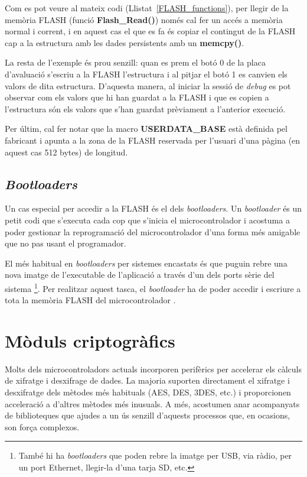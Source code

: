 Com es pot veure al mateix codi (Llistat~\ref{FLASH_functions}), per llegir de la memòria \gls{FLASH} (funció {\bf Flash\_Read()}) només cal fer un accés a memòria normal i corrent, i en aquest cas el que es fa és copiar el contingut de la FLASH cap a la estructura amb les dades persistents amb un {\bf memcpy()}.

La resta de l'exemple és prou senzill: quan es prem el botó 0 de la placa d'avaluació s'escriu a la FLASH l'estructura i al pitjar el botó 1 es canvien els valors de dita estructura. D'aquesta manera, al iniciar la sessió de {\em debug} es pot observar com els valors que hi han guardat a la FLASH i que es copien a l'estructura són els valors que s'han guardat prèviament a l'anterior execució.

Per últim, cal fer notar que la macro {\bf USERDATA\_BASE} està definida pel fabricant i apunta a la zona de la FLASH reservada per l'usuari d'una pàgina (en aquest cas 512 bytes) de longitud.

\section{\em Bootloaders}
\label{sec:Bootloader}
Un cas especial per accedir a la \gls{FLASH} és el dels {\em bootloaders}. Un {\em bootloader} és un petit codi que s'executa cada cop que s'inicia el microcontrolador i acostuma a poder gestionar la reprogramació del microcontrolador d'una forma més amigable que no pas usant el programador.

El més habitual en {\em bootloaders} per sistemes encastats és que puguin rebre una nova imatge de l'executable de l'aplicació a través d'un dels ports sèrie del sistema \footnote{També hi ha {\em bootloaders} que poden rebre la imatge per USB, via ràdio, per un port Ethernet, llegir-la d'una tarja SD, etc.}. Per realitzar aquest tasca, el {\em bootloader} ha de poder accedir i escriure a tota la memòria FLASH del microcontrolador \cite{AN0003}.


\chapter{Mòduls criptogràfics}
Molts dels microcontroladors actuals incorporen perifèrics per accelerar els càlculs de xifratge i desxifrage de dades. La majoria suporten directament el xifratge i desxifratge dels mètodes més habituals (AES, DES, 3DES, etc.) i proporcionen acceleració a d'altres mètodes més inusuals. A més, acostumen anar acompanyats de biblioteques que ajudes a un ús senzill d'aquests processos que, en ocasions, son força complexos.

